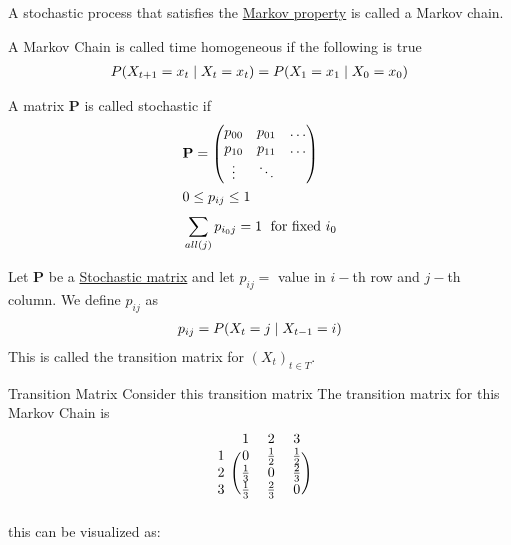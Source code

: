\documentclass[12pt,a4paper]{article}
\begin{document}
\begin{note}
A stochastic process that satisfies the \hyperref[markovprop]{Markov property} is called a Markov chain.
\end{note}

\begin{defn}
A Markov Chain is called time homogeneous if the following is true
\begin{align*}
P(X_{t+1} = x_t \;\vert\; X_t = x_t) = P(X_1 = x_1 \;\vert\; X_0 = x_0)
\end{align*}
\end{defn}

\begin{defn}
\label{stocmat}

A matrix $\mathbf{P}$ is called stochastic if
\begin{align*}
&\mathbf{P} = \mqty(
p_{00} & p_{01} & \ldots \\
p_{10} & p_{11} & \ldots \\
\vdots  & \ddots &
)\\
&0\leq p_{ij} \leq 1\\
&\nsum{all(j)}{} p_{i_0j} = 1 \; \text{ for fixed $i_0$}
\end{align*}
\end{defn}
\begin{defn}
Let $\mathbf{P}$ be a \hyperref[stocmat]{Stochastic matrix} and let $p_{ij} = $ value in $i-$th row and $j-$th column.
We define $p_{ij}$ as
\begin{align*}
&p_{ij} = P(X_{t} = j \;\vert\; X_{t-1} = i)\\
\end{align*}
This is called the transition matrix for $(X_t)_{t \in T}$.
\end{defn}
\newpage
\begin{example}{Transition Matrix}
Consider this transition matrix 
The transition matrix for this Markov Chain is
\[
\begin{blockarray}{cccc}
& 1 & 2 & 3 \\
\begin{block}{c(ccc)}
1 & 0 & \frac{1}{2} & \frac{1}{2} \\
2 & \frac{1}{3} & 0 & \frac{2}{3} \\
3 & \frac{1}{3} & \frac{2}{3} & 0 \\
\end{block}
\end{blockarray}
\]
this can be visualized as: 
\end{example}
\newpage
\end{document}
